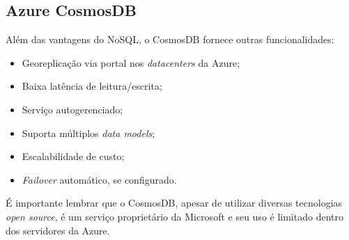 \documentclass[12pt]{article}
\begin{document}
\subsection{Azure CosmosDB}
Além das vantagens do NoSQL, o CosmosDB fornece outras funcionalidades:

\begin{itemize}
	\item Georeplicação via portal nos \textit{datacenters} da Azure;
	\item Baixa latência de leitura/escrita;
	\item Serviço autogerenciado;
	\item Suporta múltiplos \textit{data models};
	\item Escalabilidade de custo;
	\item \textit{Failover} automático, se configurado.
\end{itemize}

É importante lembrar que o CosmosDB, apesar de utilizar diversas tecnologias \textit{open source}, é um serviço proprietário da Microsoft e seu uso é limitado dentro dos 
servidores da Azure.


\end{document}
